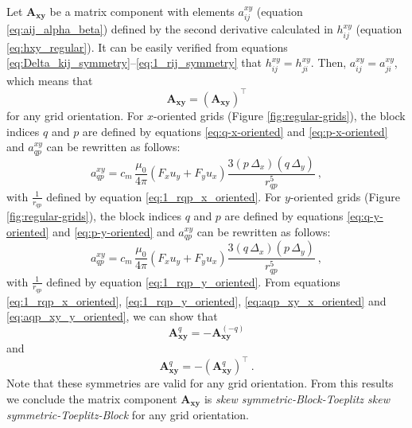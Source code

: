 \documentclass[manuscript,noblind]{geophysics}
\begin{document}
Let $\mathbf{A}_{\boldsymbol{xy}}$ be a matrix component with elements
$a^{xy}_{ij}$ (equation \ref{eq:aij_alpha_beta}) defined by the second derivative calculated in
$h^{xy}_{ij}$ (equation \ref{eq:hxy_regular}). It can be easily verified from equations
\ref{eq:Delta_kij_symmetry}--\ref{eq:1_rij_symmetry} that $h^{xy}_{ij} = h^{xy}_{ji}$.
Then, $a^{xy}_{ij} = a^{xy}_{ji}$, which means that 
\begin{equation}
	\mathbf{A}_{\boldsymbol{xy}} = \left( \mathbf{A}_{\boldsymbol{xy}} \right)^{\top}
	\label{eq:Axy_symmetry}
\end{equation}
for any grid orientation.
For $x$-oriented grids (Figure \ref{fig:regular-grids}), the block indices $q$ and $p$ are defined 
by equations \ref{eq:q-x-oriented} and 
\ref{eq:p-x-oriented} and $a^{xy}_{qp}$ can be rewritten as follows:
\begin{equation}
	a^{xy}_{qp} = c_{m} \, \frac{\mu_{0}}{4\pi} 
	\left( F_{x} u_{y} + F_{y} u_{x} \right) \frac{3 \left( p \, \Delta_{x} \right)\left( q \, \Delta_{y} \right)}{r_{qp}^{5}}
	\: ,
	\label{eq:aqp_xy_x_oriented}
\end{equation}
with $\tfrac{1}{r_{qp}}$ defined by equation \ref{eq:1_rqp_x_oriented}.
For $y$-oriented grids (Figure \ref{fig:regular-grids}), the block indices $q$ and $p$ are 
defined by equations \ref{eq:q-y-oriented} and 
\ref{eq:p-y-oriented} and $a^{xy}_{qp}$ can be rewritten as follows:
\begin{equation}
	a^{xy}_{qp} = c_{m} \, \frac{\mu_{0}}{4\pi} 
	\left( F_{x} u_{y} + F_{y} u_{x} \right) \frac{3 \left( q \, \Delta_{x} \right)\left( p \, \Delta_{y} \right)}{r_{qp}^{5}} \: ,
	\label{eq:aqp_xy_y_oriented}
\end{equation}
with $\tfrac{1}{r_{qp}}$ defined by equation \ref{eq:1_rqp_y_oriented}.
From equations \ref{eq:1_rqp_x_oriented}, \ref{eq:1_rqp_y_oriented}, \ref{eq:aqp_xy_x_oriented} 
and \ref{eq:aqp_xy_y_oriented}, we can show that
\begin{equation}
	\mathbf{A}_{\boldsymbol{xy}}^{q} = -\mathbf{A}_{\boldsymbol{xy}}^{(-q)}
	\label{eq:Axy_q_external_block_symmetry}
\end{equation}
and 
\begin{equation}
	\mathbf{A}_{\boldsymbol{xy}}^{q} = -\left( \mathbf{A}_{\boldsymbol{xy}}^{q} \right)^{\top} \: .
	\label{eq:Axy_q_internal_block_symmetry}
\end{equation}
Note that these symmetries are valid for any grid orientation.
From this results we conclude the matrix component 
$\mathbf{A}_{\boldsymbol{xy}}$ is \textit{skew symmetric-Block-Toeplitz skew symmetric-Toeplitz-Block} 
for any grid orientation.
\end{document}
